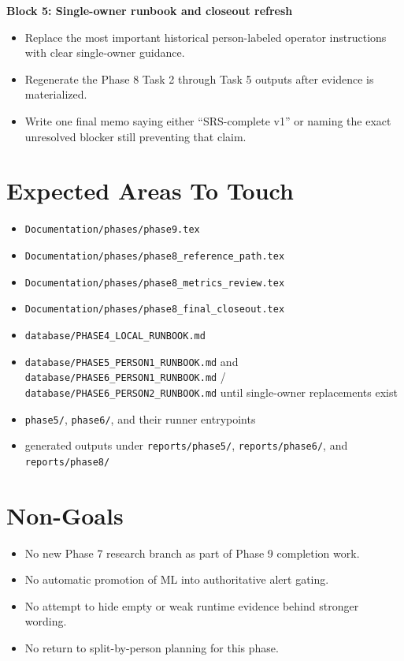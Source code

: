 \documentclass{article}
\begin{document}
\textbf{Block 5: Single-owner runbook and closeout refresh}
\begin{itemize}
\item Replace the most important historical person-labeled operator instructions with clear single-owner guidance.
\item Regenerate the Phase 8 Task 2 through Task 5 outputs after evidence is materialized.
\item Write one final memo saying either ``SRS-complete v1'' or naming the exact unresolved blocker still preventing that claim.
\end{itemize}

\section*{Expected Areas To Touch}
\begin{itemize}
\item \texttt{Documentation/phases/phase9.tex}
\item \texttt{Documentation/phases/phase8\_reference\_path.tex}
\item \texttt{Documentation/phases/phase8\_metrics\_review.tex}
\item \texttt{Documentation/phases/phase8\_final\_closeout.tex}
\item \texttt{database/PHASE4\_LOCAL\_RUNBOOK.md}
\item \texttt{database/PHASE5\_PERSON1\_RUNBOOK.md} and \texttt{database/PHASE6\_PERSON1\_RUNBOOK.md} / \texttt{database/PHASE6\_PERSON2\_RUNBOOK.md} until single-owner replacements exist
\item \texttt{phase5/}, \texttt{phase6/}, and their runner entrypoints
\item generated outputs under \texttt{reports/phase5/}, \texttt{reports/phase6/}, and \texttt{reports/phase8/}
\end{itemize}

\section*{Non-Goals}
\begin{itemize}
\item No new Phase 7 research branch as part of Phase 9 completion work.
\item No automatic promotion of ML into authoritative alert gating.
\item No attempt to hide empty or weak runtime evidence behind stronger wording.
\item No return to split-by-person planning for this phase.
\end{itemize}
\end{document}
